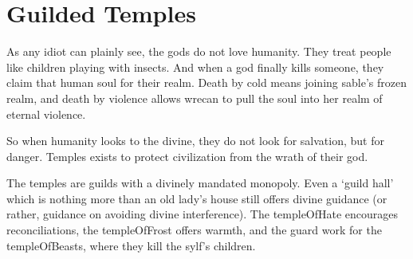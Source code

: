 \chapter{Guilded Temples}
\label{cosmology}

\newcommand\guildRank[1]{\item[#1]\index{#1 (\npcsymbol)|textbf}}

\begin{multicols}{2}

\label{godsOfDeath}

\noindent
As any idiot can plainly see, the gods do not love humanity.
They treat people like children playing with insects.
And when a god finally kills someone, they claim that human soul for their realm.
Death by cold means joining \gls{sable}'s frozen realm, and death by violence allows \gls{wrecan} to pull the soul into her realm of eternal violence.

So when humanity looks to the divine, they do not look for salvation, but for danger.
Temples exists to protect civilization from the wrath of their god.

The temples are guilds with a divinely mandated monopoly.
Even a `guild hall' which is nothing more than an old lady's house still offers divine guidance (or rather, guidance on avoiding divine interference).
The \gls{templeOfHate} encourages reconciliations, the \gls{templeOfFrost} offers warmth, and the \gls{guard} work for the \gls{templeOfBeasts}, where they kill the \gls{sylf}'s children.

\newcommand\guild[7]{
  \renewcommand\npcsymbol{\glssymbol{#1}}
  \vspace{2em}
  \needspace{16em}
  \subsection[The Temple of #2]{\glssymbol{#1}~\gls{#1}~\glssymbol{#1} \\ \& \\ the Temple of #2}
  \index{Gods}
  \label{god:#2}

  \begin{exampletext}
  \noindent
  #3
  \end{exampletext}

  \noindent
  \begin{minipage}{\linewidth}
  \begin{description}
  \item[Domain:] #4

  \item[Defence:] #5


\end{description}
\end{minipage}}
\end{multicols}
